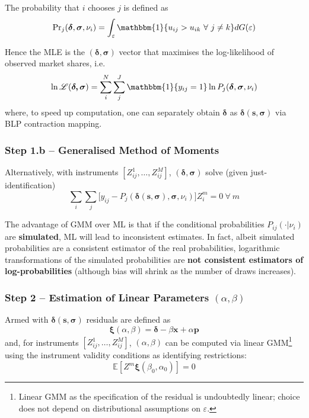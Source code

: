 \documentclass[11pt]{article}
\begin{document}
The probability that $i$ chooses $j$ is defined as
\begin{equation}
	\text{Pr}_j(\bm{\delta}, \bm{\sigma}, \nu_i) = \int_\varepsilon \mathbbm{1}\{u_{ij} > u_{ik} ~\forall~ j \neq k\} d G(\varepsilon)
\end{equation}

Hence the MLE is the $(\bm{\delta, \sigma})$ vector that maximises the log-likelihood of observed market shares, i.e.
\begin{equation}
	\ln \mathscr{L}(\bm{\delta, \sigma}) = \sum_i^N \sum_j^J \mathbbm{1}\{y_{ij} = 1\} \ln P_{j}(\bm{\delta}, \bm{\sigma}, \nu_i)
\end{equation}
where, to speed up computation, one can separately obtain $\bm{\delta}$ as $\bm{\delta}(\bm{s, \sigma})$ via BLP contraction mapping.

\subsubsection*{Step 1.b -- Generalised Method of Moments}

Alternatively, with instruments $[Z^1_{ij}, \dots, Z^M_{ij}]$, $(\bm{\delta, \sigma})$ solve (given just-identification)
\begin{equation}
	\sum_i \sum_j \big[y_{ij} - P_{j}(\bm{\delta}(\bm{s, \sigma}), \bm{\sigma}, \nu_i) \big]Z^m_i = 0 ~\forall~ m
\end{equation}

The advantage of GMM over ML is that if the conditional probabilities $P_{ij} (\cdot| \nu_i)$ are \textbf{simulated}, ML will lead to inconsistent estimates.
In fact, albeit simulated probabilities are a consistent estimator of the real probabilities, logarithmic transformations of the simulated probabilities are \textbf{not consistent estimators of log-probabilities} (although bias will shrink as the number of draws increases).

\subsubsection*{Step 2 -- Estimation of Linear Parameters $(\alpha, \beta)$}

Armed with $\bm{\delta}(\bm{s, \sigma})$ residuals are defined as
\vspace{-.25cm}
\begin{equation*}
	\bm{\xi}(\alpha, \beta) = \bm{\delta} - \beta \bm{x} + \alpha \bm{p}
\end{equation*}
and, for instruments $[Z^1_{ij}, \dots, Z^M_{ij}]$, $(\alpha, \beta)$ can be computed via linear GMM\footnote{Linear GMM as the specification of the residual is undoubtedly linear; choice does not depend on distributional assumptions on $\varepsilon$.} using the instrument validity conditions as identifying restrictions:
\begin{equation*}
	\mathbb{E}[Z^m \bm{\xi}(\beta_0, \alpha_0)] = 0
\end{equation*}
\end{document}
